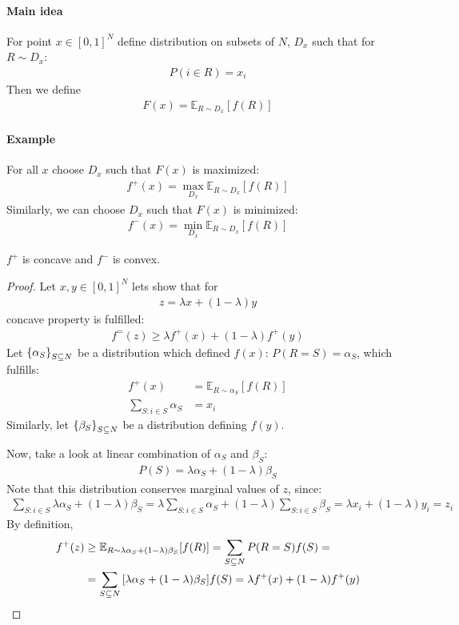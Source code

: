 \paragraph{Main idea}
For point $x\in [0,1]^N$ define distribution on subsets of $N$, $D_x$ such that for $R\sim D_x$:
\begin{align}
	P(i \in R) = x_i
\end{align}
Then we define 
\begin{align}
	F(x) = \mathbb{E}_{R\sim D_x} [f(R)]
\end{align}

\paragraph{Example}
For all $x$ choose $D_x$ such that $F(x)$ is maximized:
\begin{align}
f^+(x)  = \max\limits_{D_x}  \mathbb{E}_{R\sim D_x} [f(R)]
\end{align}
Similarly, we can choose $D_x$ such that $F(x)$ is minimized:
\begin{align}
f^-(x)  = \min\limits_{D_x}  \mathbb{E}_{R\sim D_x} [f(R)]
\end{align}

\begin{prop}
	$f^+$ is concave and $f^-$ is convex.
	\begin{proof}
		Let $x,y\in [0,1]^N$ lets show that for
		\begin{align}
			z = \lambda x + (1-\lambda)y
		\end{align}
		concave property is fulfilled:
		\begin{align}
		f^=(z) \geq \lambda f^+(x) +  (1-\lambda)f^+(y) 
		\end{align}
		Let $\qty{\alpha_S}_{S\subseteq N}$ be a distribution which defined $f(x)$: $P(R = S) = \alpha_S$, which fulfills:
		\begin{align}
		f^+(x) &= \mathbb{E}_{R\sim \alpha_S} [f(R)] \\
		\sum_{S: i\in S} \alpha_S &= x_i
		\end{align}
		Similarly, let $\qty{\beta_S}_{S\subseteq N}$ be a distribution defining $f(y)$.
		
		Now, take a look at linear combination of $\alpha_S$ and $\beta_S$:
		\begin{align}
		P(S) = \lambda\alpha_S + (1-\lambda)\beta_S
		\end{align}
		Note that this distribution conserves marginal values of $z$, since:
		\begin{align}
		\sum_{S: i\in S} \lambda \alpha_S + (1-\lambda) \beta_S = \lambda \sum_{S: i\in S} \alpha_S + (1-\lambda) \sum_{S: i\in S}\beta_S = \lambda x_i + (1-\lambda) y_i = z_i
		\end{align} 
		By definition,
		\begin{align}
		f^+(z) &\geq  \mathbb{E}_{R\sim\lambda \alpha_S + (1-\lambda) \beta_S} [f(R)] = \sum_{S \subseteq N} P(R=S) f(S) =\\&= \sum_{S \subseteq N} \qty[\lambda \alpha_S + (1-\lambda) \beta_S]f(S) = \lambda f^+(x) + (1-\lambda) f^+(y)
		\end{align}
	\end{proof}
\end{prop}


